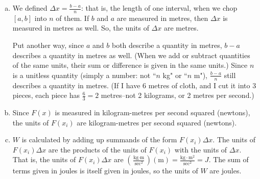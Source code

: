 \begin{solution}
\begin{enumerate}[(a)]
\item We defined $\Delta x = \frac{b-a}{n}$:  that is, the length of one interval, when we chop $[a,b]$ into $n$ of them. If $b$ and $a$ are measured in metres, then $\Delta x$ is measured in metres as well. So, the units of $\Delta x$ are metres.

Put another way, since $a$ and $b$ both describe a quantity in metres, $b-a$ describes a quantity in metres as well. (When we add or subtract quantities of the same units, their sum or difference is given in the same units.) Since $n$ is a unitless quantity (simply a number: not ``$n$ kg" or ``$n$ m"), $\frac{b-a}{n}$ still describes a quantity in metres. (If I have 6 metres of cloth, and I cut it into 3 pieces, each piece has $\frac{6}{3}=2$ metres--not 2 kilograms, or 2 metres per second.)

 \item Since $F(x)$ is measured in kilogram-metres per second squared (newtons), the units of $F(x_i)$ are kilogram-metres per second squared (newtons).

\item $W$ is calculated by adding up summands of the form $F(x_i)\Delta x$. The units of $F(x_i)\Delta x$ are the products of the units of $F(x_i)$ with the units of $\Delta x$. That is, the units of $F(x_i)\Delta x$ are $\left(\frac{\text{kg}\cdot\text{m}}{\text{sec}^2}\right)\left(\text{m}\right) = \frac{\text{kg}\cdot\text{m}^2}{\text{sec}^2} = J$. The sum of terms given in joules is itself given in joules, so the units of $W$ are joules.
\end{enumerate}

\end{solution}


